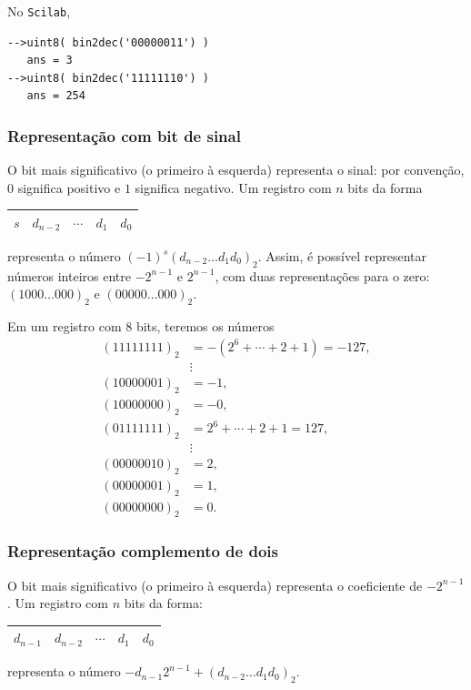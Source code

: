 \ifisscilab
\begin{ex}
  No \verb+Scilab+,
\begin{verbatim}
-->uint8( bin2dec('00000011') )
   ans = 3
-->uint8( bin2dec('11111110') )
   ans = 254
\end{verbatim}
\end{ex}
\fi

\subsubsection{Representação com bit de sinal}
O bit mais significativo (o primeiro à esquerda) representa o sinal: por convenção, $0$ significa positivo e $1$ significa negativo. Um registro com $n$ bits da forma
\begin{center}
  \begin{tabular}{|c|c|c|c|c|} \hline
    $s$ & $d_{n-2}$ & $\cdots$ & $d_1$ & $d_0$ \\\hline
  \end{tabular}  
\end{center}
representa o número $(-1)^s(d_{n-2}\ldots d_1d_0)_2$. Assim, é possível representar números inteiros entre $-2^{n-1}$ e $2^{n-1}$, com duas representações para o zero: $(1000\ldots 000)_2$ e $(00000\ldots 000)_2$.

\begin{ex}
Em um registro com $8$ bits, teremos os números
\begin{equation*}
\begin{split}
 (11111111)_2 &= -(2^{6}+\cdots+2+1)=-127,\\
 &\vdots    \\
 (10000001)_2 &= -1, \\
 (10000000)_2 &= -0, \\
 (01111111)_2 &= 2^6+\cdots+2+1=127, \\
 &\vdots    \\
 (00000010)_2 &= 2, \\
 (00000001)_2 &= 1, \\
 (00000000)_2 &= 0. 
\end{split}  
\end{equation*}
\end{ex}


\subsubsection{Representação complemento de dois}
O bit mais significativo (o primeiro à esquerda) representa o coeficiente de $-2^{n-1}$.  Um registro com $n$ bits da forma:
\begin{center}
  \begin{tabular}{|c|c|c|c|c|} \hline
    $d_{n-1}$ & $d_{n-2}$ & $\cdots$ & $d_1$ & $d_0$\\\hline
  \end{tabular}    
\end{center}
representa o número $-d_{n-1}2^{n-1}+(d_{n-2}\ldots d_1d_0)_2$. 

